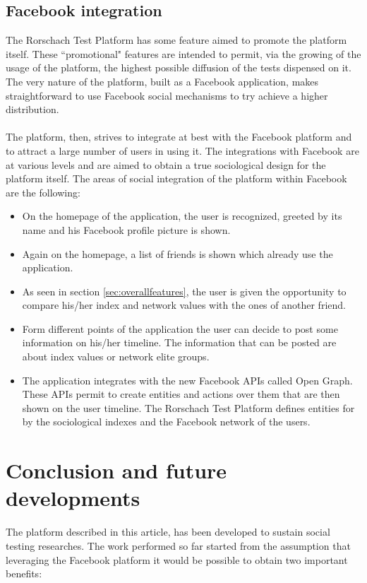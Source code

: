 \subsection{Facebook integration}
The Rorschach Test Platform has some feature aimed to promote the platform itself.
These ``promotional" features are intended to permit, via the growing of the usage of the platform, the highest possible diffusion of the tests dispensed on it.
The very nature of the platform, built as a Facebook application, makes straightforward to use Facebook social mechanisms to try achieve a higher distribution.\\
\\
The platform, then, strives to integrate at best with the Facebook platform and to attract a large number of users in using it.
The integrations with Facebook are at various levels and are aimed to obtain a true sociological design for the platform itself.
The areas of social integration of the platform within Facebook are the following:

\begin{itemize}
\item On the homepage of the application, the user is recognized, greeted by its name and his Facebook profile picture is shown.
\item Again on the homepage, a list of friends is shown which already use the application.
\item As seen in section \ref{sec:overallfeatures}, the user is given the opportunity to compare his/her index and network values with the ones of another friend.
\item Form different points of the application the user can decide to post some information on his/her timeline.
The information that can be posted are about index values or network elite groups.
\item The application integrates with the new Facebook APIs called Open Graph.
These APIs permit to create entities and actions over them that are then shown on the user timeline.
The Rorschach Test Platform defines entities for by the sociological indexes and the Facebook network of the users.
\end{itemize}

\label{sec:conclusion}
\section{Conclusion and future developments}
The platform described in this article, has been developed to sustain social testing researches.
The work performed so far started from the assumption that leveraging the Facebook platform it would be possible to obtain two important benefits:

